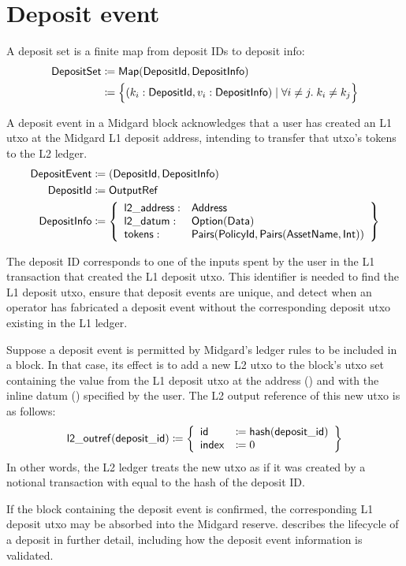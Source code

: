 \documentclass[../midgard.tex]{subfiles}
\begin{document}
\section{Deposit event}
\label{h:deposit-event}

A deposit set is a finite map from deposit IDs to deposit info:
\begin{align*}
    \mathsf{DepositSet} &\coloneq \mathsf{Map(DepositId, DepositInfo)} \\
      &\coloneq \Bigl\{
        (k_i: \mathsf{DepositId}, v_i: \mathsf{DepositInfo}) \mid \forall i \neq j.\; k_i \neq k_j
    \Bigr\}
\end{align*}

A deposit event in a Midgard block acknowledges that a user has created an L1 utxo at the Midgard L1 deposit address, intending to transfer that utxo's tokens to the L2 ledger.
\begin{align*}
    \mathsf{DepositEvent} &\coloneq (\mathsf{DepositId}, \mathsf{DepositInfo}) \\
    \mathsf{DepositId} &\coloneq \mathsf{OutputRef} \\
    \mathsf{DepositInfo} &\coloneq \left\{
        \begin{array}{ll}
            \mathsf{l2\_address} : & \mathsf{Address} \\
            \mathsf{l2\_datum} : & \mathsf{Option(Data)} \\
            \mathsf{tokens} : & \mathsf{Pairs(PolicyId, Pairs(AssetName, Int))}
        \end{array} \right\}
\end{align*}

The deposit ID corresponds to one of the inputs spent by the user in the L1 transaction that created the L1 deposit utxo.
This identifier is needed to find the L1 deposit utxo, ensure that deposit events are unique, and detect when an operator has fabricated a deposit event without the corresponding deposit utxo existing in the L1 ledger.

Suppose a deposit event is permitted by Midgard's ledger rules to be included in a block.
In that case, its effect is to add a new L2 utxo to the block's utxo set containing the value from the L1 deposit utxo at the address () and with the inline datum () specified by the user.
The L2 output reference of this new utxo is as follows: 
\begin{equation*}
    \mathsf{l2\_outref(deposit\_id)} \coloneq \left\{
    \begin{array}{ll}
        \mathsf{id} &\coloneq \mathsf{hash(deposit\_id)} \\
        \mathsf{index} &\coloneq 0
    \end{array} \right\}
\end{equation*}
In other words, the L2 ledger treats the new utxo as if it was created by a notional transaction with  equal to the hash of the deposit ID.

If the block containing the deposit event is confirmed, the corresponding L1 deposit utxo may be absorbed into the Midgard reserve.
 describes the lifecycle of a deposit in further detail, including how the deposit event information is validated.
\end{document}
